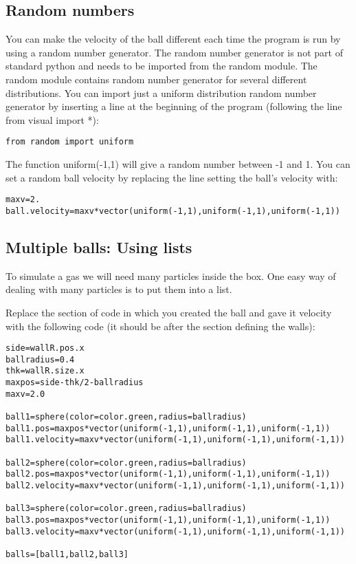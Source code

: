 \documentclass[a4paper]{letter}
\begin{document}
\subsection{Random numbers}
You can make the velocity of the ball different each time the program is run 
by using a random number generator. 
The random number generator is not part of standard python and needs to be 
imported from the random module. 
The random module contains random number generator for several different distributions. 
You can import just a uniform distribution random number generator by inserting a line at 
the beginning of the program (following the line {\color{code}from visual import *}): 
{\color{code}\begin{verbatim}
from random import uniform 
\end{verbatim}}
The function {\color{code}uniform(-1,1)} will give a random number between -1 and 1. 
You can set a random ball velocity  by replacing the line setting the ball's velocity with: 
{\color{code}\begin{verbatim}
maxv=2. 
ball.velocity=maxv*vector(uniform(-1,1),uniform(-1,1),uniform(-1,1))  
\end{verbatim}} 
\subsection{Multiple balls: Using lists}
To simulate a gas we will need many particles inside the box. 
One easy way of dealing with many particles is to put them into a list.
 
Replace the section of code in which you created the ball 
and gave it velocity with the following code 
(it should be after the section defining the walls):
{\color{code}\begin{verbatim}
side=wallR.pos.x
ballradius=0.4
thk=wallR.size.x
maxpos=side-thk/2-ballradius 
maxv=2.0 

ball1=sphere(color=color.green,radius=ballradius) 
ball1.pos=maxpos*vector(uniform(-1,1),uniform(-1,1),uniform(-1,1)) 
ball1.velocity=maxv*vector(uniform(-1,1),uniform(-1,1),uniform(-1,1)) 

ball2=sphere(color=color.green,radius=ballradius) 
ball2.pos=maxpos*vector(uniform(-1,1),uniform(-1,1),uniform(-1,1)) 
ball2.velocity=maxv*vector(uniform(-1,1),uniform(-1,1),uniform(-1,1)) 

ball3=sphere(color=color.green,radius=ballradius) 
ball3.pos=maxpos*vector(uniform(-1,1),uniform(-1,1),uniform(-1,1)) 
ball3.velocity=maxv*vector(uniform(-1,1),uniform(-1,1),uniform(-1,1))

balls=[ball1,ball2,ball3] 
\end{verbatim}}
\end{document}
